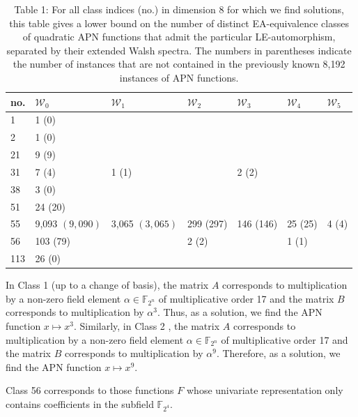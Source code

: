 \documentclass[10pt]{article}
\begin{document}
\begin{table}[h]
\begin{center}
\captionsetup{labelformat=empty}
\caption{Table 1: For all class indices (no.) in dimension 8 for which we find solutions, this table gives a lower bound on the number of distinct EA-equivalence classes of quadratic APN functions that admit the particular LE-automorphism, separated by their extended Walsh spectra. The numbers in parentheses indicate the number of instances that are not contained in the previously known 8,192 instances of APN functions.}
\begin{tabular}{|l|l|l|l|l|l|l|}
\hline
no. & $\mathcal{W}_{0}$ & $\mathcal{W}_{1}$ & $\mathcal{W}_{2}$ & $\mathcal{W}_{3}$ & $\mathcal{W}_{4}$ & $\mathcal{W}_{5}$ \\
\hline
1 & 1 (0) &  &  &  &  &  \\
\hline
2 & 1 (0) &  &  &  &  &  \\
\hline
21 & 9 (9) &  &  &  &  &  \\
\hline
31 & 7 (4) & 1 (1) &  & 2 (2) &  &  \\
\hline
38 & 3 (0) &  &  &  &  &  \\
\hline
51 & 24 (20) &  &  &  &  &  \\
\hline
55 & 9,093 $(9,090)$ & 3,065 $(3,065)$ & 299 (297) & 146 (146) & 25 (25) & 4 (4) \\
\hline
56 & 103 (79) &  & 2 (2) &  & 1 (1) &  \\
\hline
113 & 26 (0) &  &  &  &  &  \\
\hline
\end{tabular}
\end{center}
\end{table}

In Class 1 (up to a change of basis), the matrix $A$ corresponds to multiplication by a non-zero field element $\alpha \in \mathbb{F}_{2^{n}}$ of multiplicative order 17 and the matrix $B$ corresponds to multiplication by $\alpha^{3}$. Thus, as a solution, we find the APN function $x \mapsto x^{3}$. Similarly, in Class 2 , the matrix $A$ corresponds to multiplication by a non-zero field element $\alpha \in \mathbb{F}_{2^{n}}$ of multiplicative order 17 and the matrix $B$ corresponds to multiplication by $\alpha^{9}$. Therefore, as a solution, we find the APN function $x \mapsto x^{9}$.

Class 56 corresponds to those functions $F$ whose univariate representation only contains coefficients in the subfield $\mathbb{F}_{2^{4}}$.
\end{document}
